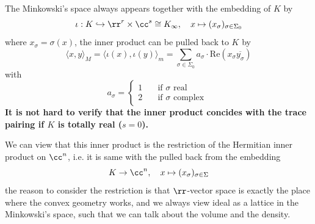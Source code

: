     \begin{remark}
        The Minkowski's space always appears together with the embedding of \(K\) by 
        \[\iota : K \hookrightarrow \rr^r\times \cc^s \cong K_{\infty} , \quad  x \mapsto (x_{\sigma})_{\sigma \in \Sigma_0} \]
        where \(x_{\sigma} = \sigma(x)\), the inner product can be pulled back to \(K\) by 
        \[\langle x,y \rangle_M = \langle \iota(x),\iota(y) \rangle_m = \sum_{\sigma \in \Sigma_0} a_\sigma \cdot \mathrm{Re}(x_\sigma \overline{y_\sigma})\]
        with  \[ a_\sigma = 
        \begin{cases}
           1 \quad &\text{if } \sigma \text{ real }\\
           2 \quad &\text{if } \sigma \text{ complex }
        \end{cases} \]
        \textbf{It is not hard to verify that the inner product concides with the trace pairing if \(K\) is totally real (\(s =0 \)).}

    \end{remark}

    \begin{remark}
        We can view that this inner product is the restriction of the Hermitian inner product on \(\cc^n\), i.e. it is same with the pulled back from the embedding
        \[K \to \cc^n , \quad x \mapsto (x_{\sigma})_{\sigma \in \Sigma}\]
        the reason to consider the restriction is that \(\rr\)-vector space is exactly the place where the convex geometry works, and we always view ideal as a lattice in the Minkowski's space, such that we can talk about the volume and the density. 
    \end{remark}

